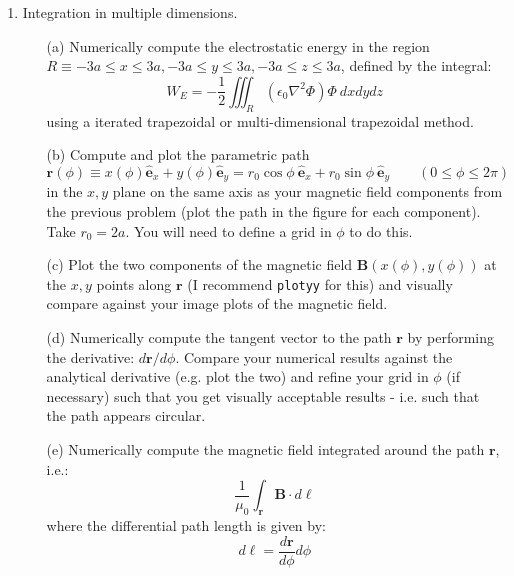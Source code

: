 \documentclass{article}
\begin{document}
\begin{enumerate}
\begin{itemize}
    
  \end{itemize}
  \item  Integration in multiple dimensions.  
  \begin{itemize}
    \item[(a)] Numerically compute the electrostatic energy in the region $R \equiv -3a \le x \le 3a, -3a \le y \le 3a, -3a \le z \le 3a$, defined by the integral:  
    \begin{equation}
      W_E = - \frac{1}{2} \iiint_R \left( \epsilon_0 \nabla^2 \Phi \right) \Phi ~dx dy dz
    \end{equation}
    using a iterated trapezoidal or multi-dimensional trapezoidal method.  
    \item[(b)]  Compute and plot the parametric path
    \begin{equation}
       \mathbf{r}(\phi) \equiv x(\phi)\hat{\mathbf{e}}_x + y(\phi)\hat{\mathbf{e}}_y = r_0 \cos \phi ~ \hat{\mathbf{e}}_x + r_0 \sin \phi ~ \hat{\mathbf{e}}_y \qquad (0 \le \phi \le 2 \pi)
    \end{equation}    
    in the $x,y$ plane on the same axis as your magnetic field components from the previous problem (plot the path in the figure for each component).  Take $r_0 = 2a$.  You will need to define a grid in $\phi$ to do this.
    \item[(c)]  Plot the two components of the magnetic field $\mathbf{B}(x(\phi),y(\phi))$ at the $x,y$ points along $\mathbf{r}$ (I recommend \texttt{plotyy} for this) and visually compare against your image plots of the magnetic field.  
    \item[(d)]  Numerically compute the tangent vector to the path $\mathbf{r}$ by performing the derivative:  $d \mathbf{r} / d \phi$.  Compare your numerical results against the analytical derivative (e.g. plot the two) and refine your grid in $\phi$ (if necessary) such that you get visually acceptable results - i.e. such that the path appears circular.  
    \item[(e)]  Numerically compute the magnetic field integrated around the path $\mathbf{r}$, i.e.:
    \begin{equation}
       \frac{1}{\mu_0} \int_{\mathbf{r}} \mathbf{B} \cdot d \boldsymbol{\ell} 
    \end{equation}
    where the differential path length is given by:
    \begin{equation}
      d \boldsymbol{\ell} = \frac{d \mathbf{r}}{d \phi} d \phi 
    \end{equation}   
  \end{itemize}
\end{enumerate}
\end{document}
